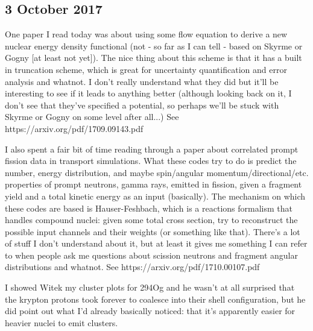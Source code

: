 \documentclass[]{report}
\begin{document}
\subsection*{3 October 2017}
One paper I read today was about using some flow equation to derive a new nuclear energy density functional (not - so far as I can tell - based on Skyrme or Gogny [at least not yet]). The nice thing about this scheme is that it has a built in truncation scheme, which is great for uncertainty quantification and error analysis and whatnot. I don't really understand what they did but it'll be interesting to see if it leads to anything better (although looking back on it, I don't see that they've specified a potential, so perhaps we'll be stuck with Skyrme or Gogny on some level after all...) See https://arxiv.org/pdf/1709.09143.pdf

I also spent a fair bit of time reading through a paper about correlated prompt fission data in transport simulations. What these codes try to do is predict the number, energy distribution, and maybe spin/angular momentum/directional/etc. properties of prompt neutrons, gamma rays, emitted in fission, given a fragment yield and a total kinetic energy as an input (basically). The mechanism on which these codes are based is Hauser-Feshbach, which is a reactions formalism that handles compound nuclei: given some total cross section, try to reconstruct the possible input channels and their weights (or something like that). There's a lot of stuff I don't understand about it, but at least it gives me something I can refer to when people ask me questions about scission neutrons and fragment angular distributions and whatnot. See https://arxiv.org/pdf/1710.00107.pdf

I showed Witek my cluster plots for 294Og and he wasn't at all surprised that the krypton protons took forever to coalesce into their shell configuration, but he did point out what I'd already basically noticed: that it's apparently easier for heavier nuclei to emit clusters.
\end{document}
